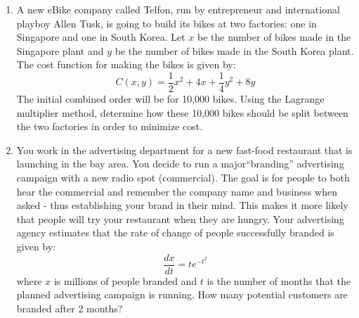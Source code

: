 \documentclass[letterpaper,12pt,fleqn]{article}
\begin{document}
\begin{enumerate}[left=0pt]
  \newpage

\item A new eBike company called Telfon, run by entrepreneur and international playboy Allen Tusk, is going to build
  its bikes at two factories: one in Singapore and one in South Korea.  Let \(x\) be the number of bikes made in the
  Singapore plant and \(y\) be the number of bikes made in the South Korea plant.  The cost function for making the bikes is
  given by:
  \[C(x,y)=\frac{1}{2}x^2+4x+\frac{1}{4}y^2+8y\]
  The initial combined order will be for 10,000 bikes.  Using the Lagrange multiplier method, determine how these 10,000 bikes
  should be split between the two factories in order to minimize cost.

  \newpage

\item You work in the advertising department for a new fast-food restaurant that is launching in the bay area.  You decide to
  run a major``branding'' advertising campaign with a new radio spot (commercial).  The goal is for people to both hear the
  commercial and remember the company name and business when asked - thus establishing your brand in their mind.  This makes it
  more likely that people will try your restaurant when they are hungry.  Your advertising agency estimates that the rate of
  change of people successfully branded is given by:
  \[\frac{dx}{dt}=te^{-t^2}\]
  where \(x\) is millions of people branded and \(t\) is the number of months that the planned advertising campaign is running.
  How many potential customers are branded after 2 months?
\end{enumerate}
\end{document}

